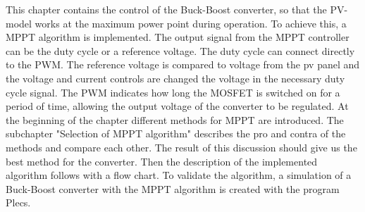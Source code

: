 This chapter contains the control of the Buck-Boost converter, so that the PV-model works at the maximum power point during operation. To achieve this, a MPPT algorithm is implemented. The output signal from the MPPT controller can be the duty cycle or a reference voltage. The duty cycle can connect directly to the PWM. The reference voltage is compared to voltage from the pv panel and the voltage and current controls are changed the voltage in the necessary duty cycle signal. The PWM indicates how long the MOSFET is switched on for a period of time, allowing the output voltage of the converter to be regulated.\newline
At the beginning of the chapter different methods for MPPT are introduced. The subchapter "Selection of MPPT algorithm" describes the pro and contra of the methods and compare each other. The result of this discussion should give us the best method for the converter. Then the description of the implemented algorithm follows with a flow chart. To validate the algorithm, a simulation of a Buck-Boost converter with the MPPT algorithm is created with the program Plecs.
